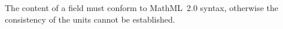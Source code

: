 The content of a  field must conform to MathML~2.0 syntax,
otherwise the consistency of the units cannot be established.
